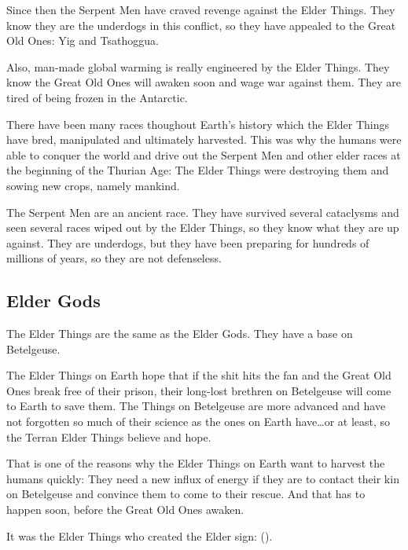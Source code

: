 \documentclass[a4paper,12pt,openany,oneside]{book}
\begin{document}
Since then the Serpent Men have craved revenge against the Elder Things. 
They know they are the underdogs in this conflict, so they have appealed to the Great Old Ones: 
Yig and Tsathoggua. 

Also, man-made global warming is really engineered by the Elder Things. 
They know the Great Old Ones will awaken soon and wage war against them.
They are tired of being frozen in the Antarctic. 

There have been many races thoughout Earth's history which the Elder Things have bred, manipulated and ultimately harvested.
This was why the humans were able to conquer the world and drive out the Serpent Men and other elder races at the beginning of the Thurian Age:
The Elder Things were destroying them and sowing new crops, namely mankind. 

The Serpent Men are an ancient race. 
They have survived several cataclysms and seen several races wiped out by the Elder Things, so they know what they are up against.
They are underdogs, but they have been preparing for hundreds of millions of years, so they are not defenseless. 









\subsection{Elder Gods}
The Elder Things are the same as the Elder Gods. 
They have a base on Betelgeuse. 

The Elder Things on Earth hope that if the shit hits the fan and the Great Old Ones break free of their prison, their long-lost brethren on Betelgeuse will come to Earth to save them.
The Things on Betelgeuse are more advanced and have not forgotten so much of their science as the ones on Earth have\ldots or at least, so the Terran Elder Things believe and hope. 

That is one of the reasons why the Elder Things on Earth want to harvest the humans quickly:
They need a new influx of energy if they are to contact their kin on Betelgeuse and convince them to come to their rescue.
And that has to happen soon, before the Great Old Ones awaken. 

It was the Elder Things who created the Elder sign: 
(\cite[p.289]{AugustDerleth:TheTrailofCthulhu}).
\end{document}
